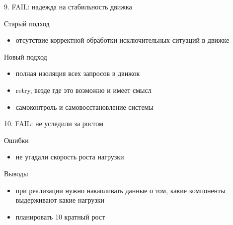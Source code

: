 \documentclass{beamer}
\begin{document}
\begin{frame}{9. FAIL: надежда на стабильность движка}
    \begin{block}{Старый подход}
        \begin{itemize}
            \item{отсутствие корректной обработки исключительных ситуаций в движке}
        \end{itemize}
    \end{block}

    \pause
    \begin{block}{Новый подход}
        \begin{itemize}
            \item{полная изоляция всех запросов в движок}
            \item{retry, везде где это возможно и имеет смысл}
            \item{самоконтроль и самовосстановление системы}
        \end{itemize}
    \end{block}
\end{frame}

\begin{frame}{10. FAIL: не уследили за ростом}
    \begin{block}{Ошибки}
        \begin{itemize}
            \item{не угадали скорость роста нагрузки}
        \end{itemize}
    \end{block}

    \pause
    \begin{block}{Выводы}
        \begin{itemize}
            \item{при реализации нужно накапливать данные о том, какие компоненты выдерживают какие нагрузки}
            \item{планировать 10 кратный рост}
        \end{itemize}
    \end{block}
\end{frame}
\end{document}
